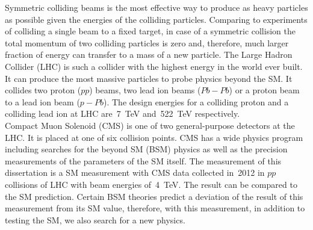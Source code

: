 Symmetric colliding beams is the most effective way to produce as heavy particles as possible given the energies of the colliding particles. Comparing to experiments of colliding a single beam to a fixed target, in case of a symmetric collision the total momentum of two colliding particles is zero and, therefore, much larger fraction of energy can transfer to a mass of a new particle.  The Large Hadron Collider (LHC) is such a collider with the highest energy in the world ever built. It can produce the most massive particles to probe physics beyond the SM. It collides two proton ($pp$) beams, two lead ion beams ($Pb-Pb$) or a proton beam to a lead ion beam ($p-Pb$). The design energies for a colliding proton and a colliding lead ion at LHC are~7~TeV and~522~TeV respectively. \\

Compact Muon Solenoid (CMS) is one of two general-purpose detectors at the LHC. It is placed at one of six collision points. CMS has a wide physics program including searches for the beyond SM (BSM) physics as well as the precision measurements of the parameters of the SM itself. The measurement of this dissertation is a SM measurement with CMS data collected in~2012 in $pp$ collisions of LHC with beam energies of~4~TeV. The result can be compared to the SM prediction. Certain BSM theories predict a deviation of the result of this measurement from its SM value, therefore, with this measurement, in addition to testing the SM, we also search for a new physics.\\


